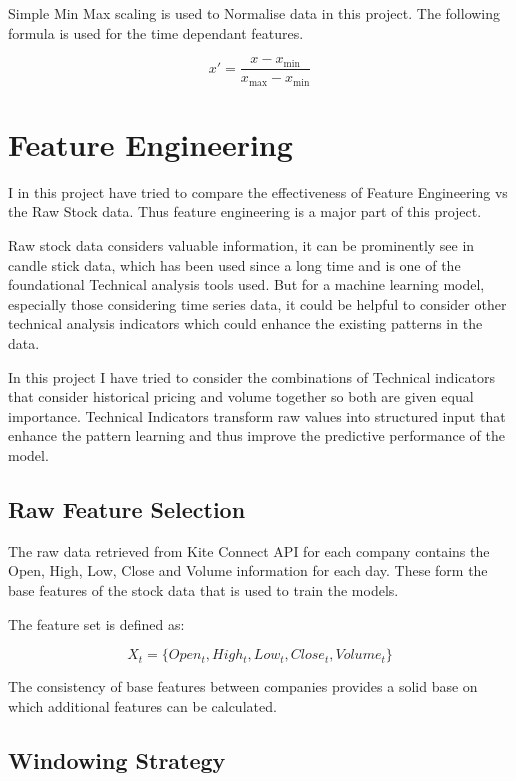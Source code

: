 Simple Min Max scaling is used to Normalise data in this project. The following formula is used for the time dependant features.

\begin{equation}
x' = \frac{x - x_{\text{min}}}{x_{\text{max}} - x_{\text{min}}}
\end{equation}

\section{Feature Engineering}

I in this project have tried to compare the effectiveness of Feature Engineering vs the Raw Stock data. Thus feature engineering is a major part of this project.

Raw stock data considers valuable information, it can be prominently see in candle stick data, which has been used since a long time and is one of the foundational Technical analysis tools used. But for a machine learning model, especially those considering time series data, it could be helpful to consider other technical analysis indicators which could enhance the existing patterns in the data.

In this project I have tried to consider the combinations of Technical indicators that consider historical pricing and volume together so both are given equal importance. Technical Indicators transform raw values into structured input that enhance the pattern learning and thus improve the predictive performance of the model.

\subsection{Raw Feature Selection}

The raw data retrieved from Kite Connect API for each company contains the Open, High, Low, Close and Volume information for each day. These form the base features of the stock data that is used to train the models.

The feature set is defined as:

\begin{equation}
X_t = \{Open_t, High_t, Low_t, Close_t, Volume_t\}
\end{equation}

The consistency of base features between companies provides a solid base on which additional features can be calculated.

\subsection{Windowing Strategy}

